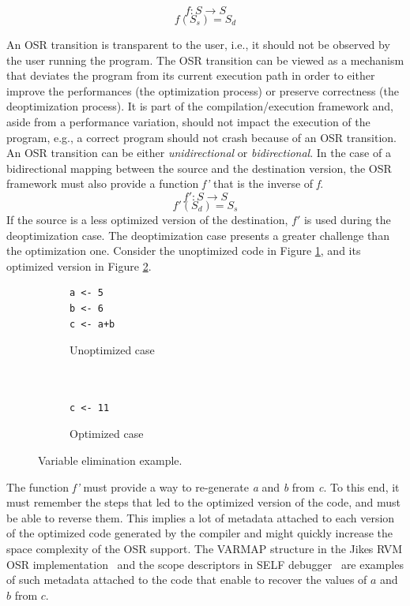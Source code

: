 \[f: S \rightarrow S\]
\[f(S_s) = S_d\]

An OSR transition is transparent to the user, i.e., it should not be observed by the user running the program.
The OSR transition can be viewed as a mechanism that deviates the program from its current execution path in order to either improve the performances (the optimization process) or preserve correctness (the deoptimization process).
It is part of the compilation/execution framework and, aside from a performance variation, should not impact the execution of the program, e.g., a correct program should not crash because of an OSR transition.\\

An OSR transition can be either \textit{unidirectional} or \textit{bidirectional}.
In the case of a bidirectional mapping between the source and the destination version, the OSR framework must also provide a function \textit{f'} that is the inverse of \textit{f}.  
\[f': S \rightarrow S\]
\[f'(S_d) = S_s\]
If the source is a less optimized version of the destination, $f'$ is used during the deoptimization case.
The deoptimization case presents a greater challenge than the optimization one.
Consider the unoptimized code in Figure \ref{unoptimizedcase}, and its optimized version in Figure \ref{optimizedcase}.

\begin{figure}[h]
\centering
\begin{subfigure}{.49\textwidth}
  \centering
  \begin{lstlisting}
a <- 5
b <- 6
c <- a+b
    \end{lstlisting}
  \caption{Unoptimized case}
  \label{unoptimizedcase}
\end{subfigure}%
\begin{subfigure}{.49\textwidth}
  \centering
  \begin{lstlisting}
  
  
c <- 11
    \end{lstlisting}
  \caption{Optimized case}
  \label{optimizedcase}
\end{subfigure}
\caption{Variable elimination example.}
\label{variableEliminationExample}
\end{figure}


The function \textit{f'} must provide a way to re-generate \textit{a} and \textit{b} from \textit{c}. 
To this end, it must remember the steps that led to the optimized version of the code, and must be able to reverse them.
This implies a lot of metadata attached to each version of the optimized code generated by the compiler and might quickly increase the space complexity of the OSR support.
The VARMAP structure in the Jikes RVM OSR implementation~\cite{soman2006efficient} and the scope descriptors in SELF debugger~\cite{holzle1992debugging} are examples of such metadata attached to the code that enable to recover the values of $a$ and $b$ from $c$.\\
 
